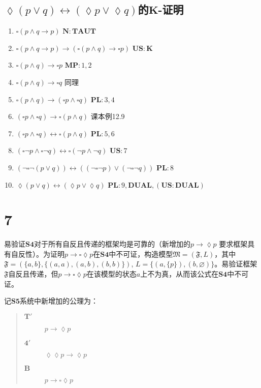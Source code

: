 \documentclass{article}
\begin{document}
\subsection*{$\lozenge(p \vee q) \leftrightarrow (\lozenge p \vee \lozenge q)$的$\mathbf{K}$-证明}
\begin{enumerate}
  \item $\square (p \wedge q \rightarrow p)$ \hfill $\mathbf{N: TAUT}$
  \item $\square (p \wedge q \rightarrow p) \rightarrow (\square (p \wedge q) \rightarrow \square p)$ \hfill $\mathbf{US: K}$
  \item $\square (p \wedge q) \rightarrow \square p$ \hfill $\mathbf{MP}: 1, 2$
  \item $\square (p \wedge q) \rightarrow \square q$ \hfill 同理
  \item $\square (p \wedge q) \rightarrow (\square p \wedge \square q)$ \hfill $\mathbf{PL}: 3, 4$

  \item $(\square p \wedge \square q) \rightarrow \square (p \wedge q)$ \hfill 课本例12.9
  \item $(\square p \wedge \square q) \leftrightarrow \square (p \wedge q)$ \hfill $\mathbf{PL}: 5, 6$
  \item $(\square \neg p \wedge \square \neg q) \leftrightarrow \square (\neg p \wedge \neg q)$ \hfill $\mathbf{US}: 7$
  \item $(\neg \square \neg (p \vee q)) \leftrightarrow ((\neg \square \neg p) \vee (\neg \square \neg q))$ \hfill $\mathbf{PL}: 8$
  \item $\lozenge(p \vee q) \leftrightarrow (\lozenge p \vee \lozenge q)$ \hfill $\mathbf{PL}: 9, \mathbf{DUAL}, (\mathbf{US: DUAL})$
\end{enumerate}

\section*{7}
易验证$\mathbf{S4}$对于所有自反且传递的框架均是可靠的（新增加的$p \rightarrow \lozenge p$ 要求框架具有自反性）。为证明$p \rightarrow \square \lozenge p$在$\mathbf{S4}$中不可证，构造模型$\mathfrak{M} = (\mathfrak{F}, L)$，其中$\mathfrak{F} = (\{a, b\}, \{(a,a), (a,b), (b,b)\})$, $L = \{(a, \{p\}), (b, \varnothing)\}$。易验证框架$\mathfrak{F}$自反且传递，但$p \rightarrow \square \lozenge p$在该模型的状态$a$上不为真，从而该公式在$\mathbf{S4}$中不可证。

记$\mathbf{S5}$系统中新增加的公理为：
\begin{quote}
\begin{description}
  \item[$\mathbf{T'}$] $p \rightarrow \lozenge p$
  \item[$\mathbf{4'}$] $\lozenge \lozenge p \rightarrow \lozenge p$
  \item[$\mathbf{B}$] $p \rightarrow \square \lozenge p$
\end{description}
\end{quote}
\end{document}
